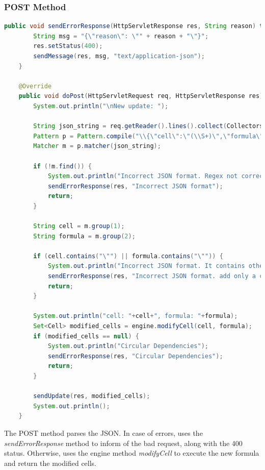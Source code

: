 \documentclass[12pt, a4paper]{article}
\begin{document}
  \subsubsection{POST Method}
  \begin{lstlisting}[language=java, caption={POST route}]
    public void sendErrorResponse(HttpServletResponse res, String reason) throws IOException {
        String msg = "{\"reason\": \"" + reason + "\"}";
        res.setStatus(400);
        sendMessage(res, msg, "text/application-json");
    }

    @Override
    public void doPost(HttpServletRequest req, HttpServletResponse res) throws IOException {
        System.out.println("\nNew update: ");

        String json_string = req.getReader().lines().collect(Collectors.joining(System.lineSeparator()));
        Pattern p = Pattern.compile("\\{\"cell\":\"(\\S+)\",\"formula\":\"(\\S*)\"}");
        Matcher m = p.matcher(json_string);

        if (!m.find()) {
            System.out.println("Incorrect JSON format. Regex not correct");
            sendErrorResponse(res, "Incorrect JSON format");
            return;
        }

        String cell = m.group(1);
        String formula = m.group(2);

        if (cell.contains("\"") || formula.contains("\"")) {
            System.out.println("Incorrect JSON format. It contains other fields as well");
            sendErrorResponse(res, "Incorrect JSON format. add only a cell and a formula field");
            return;
        }

        System.out.println("cell: "+cell+", formula: "+formula);
        Set<Cell> modified_cells = engine.modifyCell(cell, formula);
        if (modified_cells == null) {
            System.out.println("Circular Dependencies");
            sendErrorResponse(res, "Circular Dependencies");
            return;
        }

        sendUpdate(res, modified_cells);
        System.out.println();
    }    
  \end{lstlisting}
  The POST method parses the JSON. In case of errors, uses the \textit{sendErrorResponse} method to inform of the bad request, along with the 400 status. Otherwise, uses the engine method \textit{modifyCell} to execute the new formula and return the modified cells.
\end{document}
